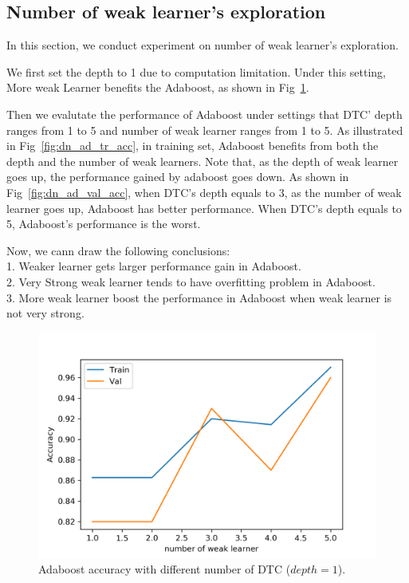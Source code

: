 \documentclass[journal, a4paper]{IEEEtran}
\begin{document}
\subsection{Number of weak learner's exploration}
In this section, we conduct experiment on number of weak learner's exploration. \par 
We first set the depth to 1 due to computation limitation. Under this setting, More weak Learner benefits the Adaboost, as shown in Fig~\ref{fig:n_ad_acc}.\par
Then we evalutate the performance of Adaboost under settings that DTC' depth ranges from 1 to 5 and number of weak learner ranges from 1 to 5. As illustrated in Fig~\ref{fig:dn_ad_tr_acc}, in training set, Adaboost benefits from both the depth and the number of weak learners. Note that, as the depth of weak learner goes up, the performance gained by adaboost goes down. As shown in Fig~\ref{fig:dn_ad_val_acc}, when DTC's depth equals to 3, as the number of weak learner goes up, Adaboost has better performance. When DTC's depth equals to 5, Adaboost's performance is the worst. \par
Now, we cann draw the following conclusions: \\
1. Weaker learner gets larger performance gain in Adaboost. \\
2. Very Strong weak learner tends to have overfitting problem in Adaboost. \\
3. More weak learner boost the performance in Adaboost when weak learner is not very strong. \par

\begin{figure}[!hbt]
	\begin{center}
		\includegraphics[width=\columnwidth]{n_ad_acc}
		\caption{Adaboost accuracy with different number of DTC ($depth=1$).}
		\label{fig:n_ad_acc}
	\end{center}
\end{figure} \par
\end{document}
